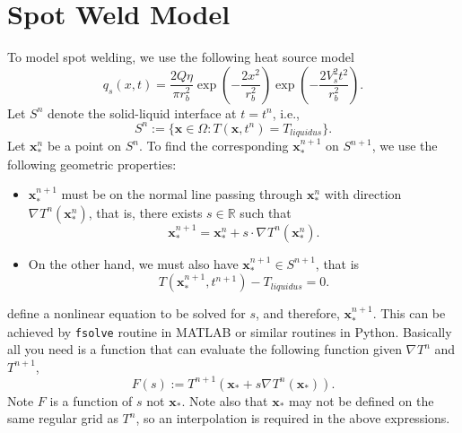 \documentclass[a4paper,12pt]{article}
\newcommand{\V}[1]{\boldsymbol{#1}}
\newcommand{\grad}[1]{\nabla_{#1}}
\begin{document}
\section{Spot Weld Model}
To model spot welding, we use the following heat source model
\begin{equation}
q_s(x,t) =  \frac{2Q\eta}{\pi r_b^2} \exp \left( -\frac{ 2x^2}{ r_b^2} \right)   \exp \left( -\frac{ 2V_s^2t^2}{ r_b^2} \right).
\end{equation}
Let $S^n$ denote the solid-liquid interface at $t=t^n$, i.e., 
\begin{equation}
S^n := \{  \V{x} \in \Omega : T(\V{x} ,t^n) = T_{liquidus} \}.
\end{equation}
Let $\V{x}_*^n$ be a point on $S^n$. To find the corresponding $\V{x}^{n+1}_*$ on $S^{n+1}$, we use the following geometric properties:
\begin{itemize}
\item $\V{x}_*^{n+1}$ must be on the normal line passing through $\V{x}_*^n$ with direction  $  \grad{} T^n(\V{x}_*^n) $, that is, there exists $s \in \mathbb{R}$ such that
\begin{equation}
\V{x}_*^{n+1} = \V{x}_*^{n} + s \cdot  \grad{} T^n (\V{x}_*^n).
\label{eq:sl1}
\end{equation}

\item On the other hand, we must also have $\V{x}^{n+1}_* \in S^{n+1}$, that is 
\begin{equation}
T( \V{x}^{n+1}_* , t^{n+1}) - T_{liquidus} = 0.
\label{eq:sl2}
\end{equation}

\end{itemize}
 define a nonlinear equation to be solved for $s$, and therefore, $\V{x}^{n+1}_*$. This can be achieved by \verb|fsolve| routine in MATLAB or similar routines in Python. Basically all you need is a function that can evaluate the following function given $\grad{} {T}^n$ and $T^{n+1}$,
\begin{equation}
F(s) := T^{n+1} ( \V{x_*} + s \grad{} {T}^n(\V{x_*})).
\end{equation}
Note $F$ is a function of $s$ not $\V{x}_*$.
Note also that $\V{x}_*$ may not be defined on the same regular grid as $T^n$, so an interpolation is required in the above expressions. 
\end{document}
